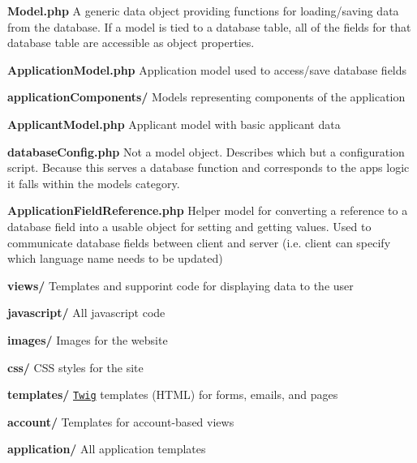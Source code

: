 \begin{DoxyItemize}
\begin{DoxyItemize}
\begin{DoxyItemize}
\item {\bfseries Model.\-php} A generic data object providing functions for loading/saving data from the database. If a model is tied to a database table, all of the fields for that database table are accessible as object properties.
\item {\bfseries Application\-Model.\-php} Application model used to access/save database fields
\item {\bfseries application\-Components/} Models representing components of the application
\item {\bfseries Applicant\-Model.\-php} Applicant model with basic applicant data
\item {\bfseries database\-Config.\-php} Not a model object. Describes which but a configuration script. Because this serves a database function and corresponds to the apps logic it falls within the models category.
\item {\bfseries Application\-Field\-Reference.\-php} Helper model for converting a reference to a database field into a usable object for setting and getting values. Used to communicate database fields between client and server (i.\-e. client can specify which language name needs to be updated)
\end{DoxyItemize}
\end{DoxyItemize}


\begin{DoxyItemize}
\item {\bfseries views/} Templates and supporint code for displaying data to the user


\begin{DoxyItemize}
\item {\bfseries javascript/} All javascript code
\item {\bfseries images/} Images for the website
\item {\bfseries css/} C\-S\-S styles for the site
\item {\bfseries templates/} \href{http://twig.sensiolabs.org}{\tt Twig} templates (H\-T\-M\-L) for forms, emails, and pages


\begin{DoxyItemize}
\item {\bfseries account/} Templates for account-\/based views
\item {\bfseries application/} All application templates



\end{DoxyItemize}
\end{DoxyItemize}
\end{DoxyItemize}
\end{DoxyItemize}
